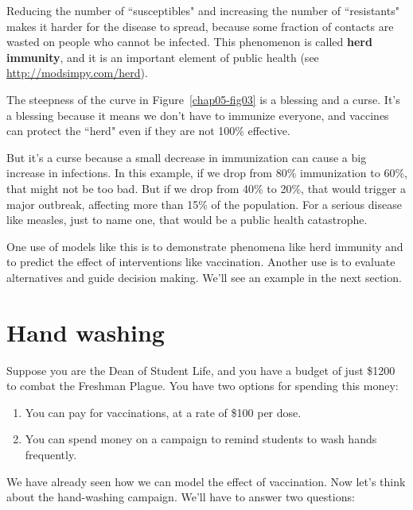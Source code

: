 \documentclass[12pt]{book}
\theoremstyle{exercise}
\begin{document}
Reducing the number of ``susceptibles" and increasing the number of ``resistants" makes it harder for the disease to spread, because some fraction of contacts are wasted on people who cannot be infected.  This phenomenon is called {\bf herd immunity}, and it is an important element of public health (see \url{http://modsimpy.com/herd}).


The steepness of the curve in Figure~\ref{chap05-fig03} is a blessing and a curse.  It's a blessing because it means we don't have to immunize everyone, and vaccines can protect the ``herd" even if they are not 100\% effective.

But it's a curse because a small decrease in immunization can cause a big increase in infections.  In this example, if we drop from 80\% immunization to 60\%, that might not be too bad.  But if we drop from 40\% to 20\%, that would trigger a major outbreak, affecting more than 15\% of the population.  For a serious disease like measles, just to name one, that would be a public health catastrophe.


One use of models like this is to demonstrate phenomena like herd immunity and to predict the effect of interventions like vaccination.  Another use is to evaluate alternatives and guide decision making.  We'll see an example in the next section.





\section{Hand washing}

Suppose you are the Dean of Student Life, and you have a budget of just \$1200 to combat the Freshman Plague.  You have two options for spending this money:

\begin{enumerate}

\item You can pay for vaccinations, at a rate of \$100 per dose.

\item You can spend money on a campaign to remind students to wash hands frequently.

\end{enumerate}

We have already seen how we can model the effect of vaccination.  Now let's think about the hand-washing campaign.  We'll have to answer two questions:
\end{document}
